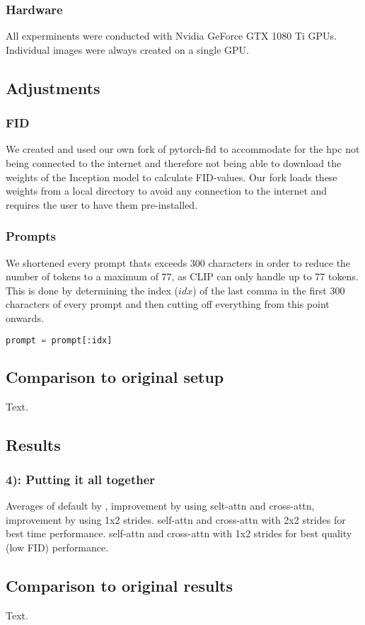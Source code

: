 \subsubsection*{Hardware}
All experminents were conducted with Nvidia GeForce GTX 1080 Ti GPUs. Individual images were always created on a single GPU.

\subsection{Adjustments}
\subsubsection*{FID}
We created and used our own fork of pytorch-fid \cite{Seitzer2020FID} to accommodate for the hpc not being connected to the internet and therefore not being able to download the weights of the Inception model to calculate FID-values. Our fork loads these weights from a local directory to avoid any connection to the internet and requires the user to have them pre-installed.

\subsubsection*{Prompts}
We shortened every prompt thats exceeds 300 characters in order to reduce the number of tokens to a maximum of 77, as CLIP \cite{radford2021learning} can only handle up to 77 tokens.\\
This is done by determining the index (\(idx\)) of the last comma in the first 300 characters of every prompt and then cutting off everything from this point onwards.
\begin{lstlisting}[language=Python]
prompt = prompt[:idx]
\end{lstlisting}

\subsection{Comparison to original setup}
Text.

\newpage
\subsection{Results}



\newpage
\subsubsection*{4): Putting it all together}
Averages of default by \cite{bolya2023tomesd}, improvement by using selt-attn and cross-attn, improvement by using 1x2 strides. 
self-attn and cross-attn with 2x2 strides for best time performance. self-attn and cross-attn with 1x2 strides for best quality (low FID) performance.
\begin{figure}[!htb]
    
    
\end{figure}

\newpage
\subsection{Comparison to original results}
Text.